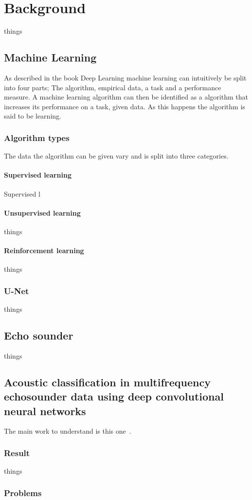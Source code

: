 \chapter{Background}
    things
    
\section{Machine Learning} \label{Machine Learning}
    As described in the book Deep Learning\cite{Goodfellow-et-al-2016_ML} machine learning can intuitively be split into four parts; The algorithm, empirical data, a task and a performance measure. A machine learning algorithm can then be identified as a algorithm that increases its performance on a task, given data. As this happens the algorithm is said to be learning.
    
    \subsection{Algorithm types} \label{Algorithm types}
        The data the algorithm can be given vary and is split into three categories\cite{Goodfellow-et-al-2016_E}.
        
        \subsubsection{Supervised learning}
            Supervised l
            
        \subsubsection{Unsupervised learning}
            things
                
        \subsubsection{Reinforcement learning}
                things
            
    \subsection{U-Net}
        things

\section{Echo sounder}
    things
    
    
\section{Acoustic classification in multifrequency echosounder data using deep convolutional neural networks}
    
    The main work to understand is this one~\cite{brautaset2020acoustic}. 
    
    
    
    \subsection{Result}
        things
    \subsection{Problems}
        
    